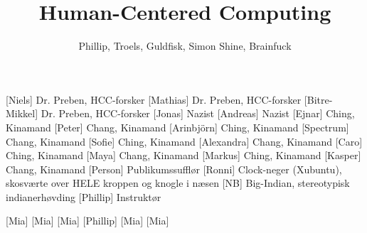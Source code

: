 \documentclass[a4paper,11pt]{article}
\title{Human-Centered Computing}
\author{Phillip, Troels, Guldfisk, Simon Shine, Brainfuck}
\begin{document}
\maketitle

\begin{roles}
[Niels] Dr. Preben, HCC-forsker
[Mathias] Dr. Preben, HCC-forsker
[Bitre-Mikkel] Dr. Preben, HCC-forsker
[Jonas] Nazist
[Andreas] Nazist
[Ejnar] Ching, Kinamand
[Peter] Chang, Kinamand
[Arinbjörn] Ching, Kinamand
[Spectrum] Chang, Kinamand
[Sofie] Ching, Kinamand
[Alexandra] Chang, Kinamand
[Caro] Ching, Kinamand
[Maya] Chang, Kinamand
[Markus] Ching, Kinamand
[Kasper] Chang, Kinamand
[Person] Publikumssufflør
[Ronni] Clock-neger (Xubuntu), skosværte over HELE kroppen og knogle i næsen
[NB] Big-Indian, stereotypisk indianerhøvding
[Phillip] Instruktør
\end{roles}

\begin{props}
[Mia]
[Mia]
[Mia]
[Phillip]
[Mia]
[Mia]
\end{props}
\end{document}
